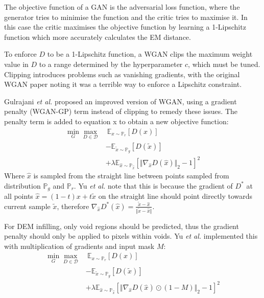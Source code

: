 \documentclass[twocolumn]{article}
\begin{document}
The objective function of a GAN is the adversarial loss function, where the generator tries to minimise the function and the critic tries to maximise it.
In this case the critic maximises the objective function by learning a 1-Lipschitz function which more accurately calculates the EM distance.

To enforce \(D\) to be a 1-Lipschitz function, a WGAN clips the maximum weight value in \(D\) to a range determined by the hyperparameter \(c\), which must be tuned.
Clipping introduces problems such as vanishing gradients, with the original WGAN paper noting it was a terrible way to enforce a Lipschitz constraint\autocite{arjovskyWassersteinGenerativeAdversarial2017}.

Gulrajani \emph{et al.}\autocite{gulrajaniImprovedTrainingWasserstein2017} proposed an improved version of WGAN, using a gradient penalty (WGAN-GP) term instead of clipping to remedy these issues.
The penalty term is added to equation x to obtain a new objective function:
\begin{equation}
\begin{split}
 \min_G \max_{D \in \mathcal{D}} &\  \mathbb{E}_{x \sim \mathbb{P}_r} \left[D(x)\right] \\  &- \mathbb{E}_{\tilde{x} \sim \mathbb{P}_g} \left[ D(\tilde{x}) \right] \\ &+ \lambda \mathbb{E}_{\hat{x} \sim \mathbb{P}_{\hat{x}}} \left[ \Vert \nabla_{\hat{x}}D(\hat{x}) \Vert_2 - 1 \right]^2
\end{split}
\end{equation}
Where \(\hat{x}\) is sampled from the straight line between points sampled from distribution \(\mathbb{P}_g\) and \(\mathbb{P}_r\).
Yu \emph{et al.}\autocite{yuGenerativeImageInpainting2018} note that this is because the gradient of \(D^*\) at all points \(\hat{x} = (1-t)x + t\tilde{x}\) on the straight line should point directly towards current sample \(\tilde{x}\), therefore \(\nabla_{\hat{x}}D^*(\hat{x}) = \frac{\tilde{x} - \hat{x}}{\Vert \tilde{x} - \hat{x} \Vert}\).

For DEM infilling, only void regions should be predicted, thus the gradient penalty should only be applied to pixels within voids.
Yu \emph{et al.} implemented this with multiplication of gradients and input mask \(M\):
\begin{equation}
\begin{split}
 \min_G \max_{D \in \mathcal{D}} &\ \mathbb{E}_{x \sim \mathbb{P}_r} \left[D(x)\right] \\ &- \mathbb{E}_{\tilde{x} \sim \mathbb{P}_g} \left[ D(\tilde{x}) \right] \\ &+ \lambda \mathbb{E}_{\hat{x} \sim \mathbb{P}_{\hat{x}}} \left[ \Vert \nabla_{\hat{x}}D(\hat{x}) \odot (1 - M) \Vert_2 - 1 \right]^2
\end{split}
\end{equation}
\end{document}
